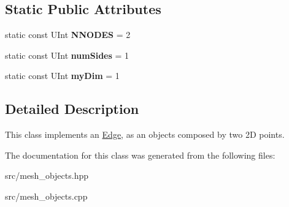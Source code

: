 \subsection*{Static Public Attributes}
\begin{DoxyCompactItemize}
\item 
\hypertarget{classEdge_a77f401000ef6b1c32dd07f66e12c28f8}{
static const UInt {\bfseries NNODES} = 2}
\label{classEdge_a77f401000ef6b1c32dd07f66e12c28f8}

\item 
\hypertarget{classEdge_a11c1f025b24fb0b0b83da5ecd990eea0}{
static const UInt {\bfseries numSides} = 1}
\label{classEdge_a11c1f025b24fb0b0b83da5ecd990eea0}

\item 
\hypertarget{classEdge_af57901544ca809e56b0ef5517565f01a}{
static const UInt {\bfseries myDim} = 1}
\label{classEdge_af57901544ca809e56b0ef5517565f01a}

\end{DoxyCompactItemize}


\subsection{Detailed Description}
This class implements an \hyperlink{classEdge}{Edge}, as an objects composed by two 2D points. 

The documentation for this class was generated from the following files:\begin{DoxyCompactItemize}
\item 
src/mesh\_\-objects.hpp\item 
src/mesh\_\-objects.cpp\end{DoxyCompactItemize}
